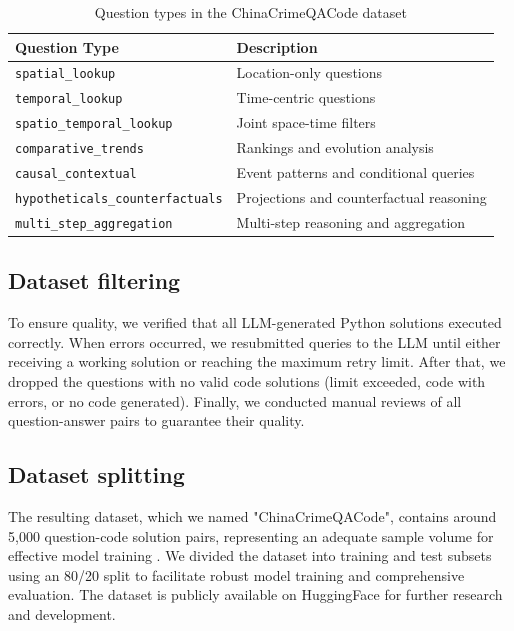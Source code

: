 \begin{table}[H]
\centering
\caption{Question types in the ChinaCrimeQACode dataset}
\label{tab:question_types}
\begin{tabular}{ll}
\toprule
\textbf{Question Type} & \textbf{Description} \\
\midrule
\texttt{spatial\_lookup} & Location-only questions \\
\texttt{temporal\_lookup} & Time-centric questions \\
\texttt{spatio\_temporal\_lookup} & Joint space-time filters \\
\texttt{comparative\_trends} & Rankings and evolution analysis \\
\texttt{causal\_contextual} & Event patterns and conditional queries \\
\texttt{hypotheticals\_counterfactuals} & Projections and counterfactual reasoning \\
\texttt{multi\_step\_aggregation} & Multi-step reasoning and aggregation \\
\bottomrule
\end{tabular}
\end{table}


\subsection{Dataset filtering}

To ensure quality, we verified that all LLM-generated Python solutions executed correctly. When errors occurred, we resubmitted queries to the LLM until either receiving a working solution or reaching the maximum retry limit. After that, we dropped the questions with no valid code solutions (limit exceeded, code with errors, or no code generated). Finally, we conducted manual reviews of all question-answer pairs to guarantee their quality.

\subsection{Dataset splitting}

The resulting dataset, which we named "ChinaCrimeQACode", contains around 5,000 question-code solution pairs, representing an adequate sample volume for effective model training \citep{Unsloth2024Dataset1}. We divided the dataset into training and test subsets using an 80/20 split to facilitate robust model training and comprehensive evaluation. The dataset is publicly available on HuggingFace for further research and development.  %

